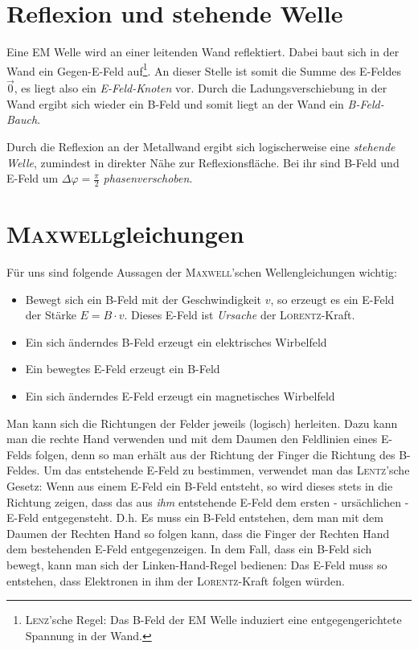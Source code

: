 		\section{Reflexion und stehende Welle}

Eine EM Welle wird an einer leitenden Wand reflektiert. Dabei baut sich in der Wand ein Gegen-E-Feld auf\footnote{\textsc{Lenz}'sche Regel: Das B-Feld der EM Welle induziert eine entgegengerichtete Spannung in der Wand.}. An dieser Stelle ist somit die Summe des E-Feldes \(\vec{0}\), es liegt also ein \emph{E-Feld-Knoten} vor. Durch die Ladungsverschiebung in der Wand ergibt sich wieder ein B-Feld und somit liegt an der Wand ein \emph{B-Feld-Bauch}.


Durch die Reflexion an der Metallwand ergibt sich logischerweise eine \emph{stehende Welle}, zumindest in direkter Nähe zur Reflexionsfläche. Bei ihr sind B-Feld und E-Feld um \(\Delta \varphi = \frac{\pi}{2}\) \emph{phasenverschoben}.




		\section{\textsc{Maxwell}gleichungen}

Für uns sind folgende Aussagen der \textsc{Maxwell}'schen Wellengleichungen wichtig:
\begin{itemize}
 \item Bewegt sich ein B-Feld mit der Geschwindigkeit \(v\), so erzeugt es ein E-Feld der Stärke \(E = B \cdot v\). Dieses E-Feld ist \emph{Ursache} der \textsc{Lorentz}-Kraft.
 
 \item Ein sich änderndes B-Feld erzeugt ein elektrisches Wirbelfeld
 
 \item Ein bewegtes E-Feld erzeugt ein B-Feld
 
 \item Ein sich änderndes E-Feld erzeugt ein magnetisches Wirbelfeld
\end{itemize}

Man kann sich die Richtungen der Felder jeweils (logisch) herleiten. Dazu kann man die rechte Hand verwenden und mit dem Daumen den Feldlinien eines E-Felds folgen, denn so man erhält aus der Richtung der Finger die Richtung des B-Feldes. Um das entstehende E-Feld zu bestimmen, verwendet man das \textsc{Lentz}'sche Gesetz: Wenn aus einem E-Feld ein B-Feld entsteht, so wird dieses stets in die Richtung zeigen, dass das aus \emph{ihm} entstehende E-Feld dem ersten - ursächlichen - E-Feld entgegensteht. D.h. Es muss ein B-Feld entstehen, dem man mit dem Daumen der Rechten Hand so folgen kann, dass die Finger der Rechten Hand dem bestehenden E-Feld entgegenzeigen. 
In dem Fall, dass ein B-Feld sich bewegt, kann man sich der Linken-Hand-Regel bedienen: Das E-Feld muss so entstehen, dass Elektronen in ihm der \textsc{Lorentz}-Kraft folgen würden.





